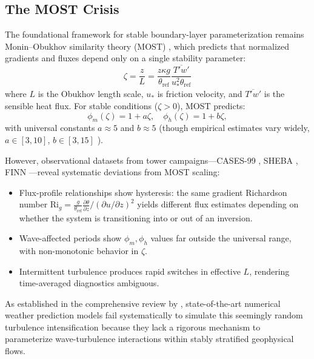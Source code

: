 \documentclass[11pt,a4paper]{article}
\begin{document}
\subsection{The MOST Crisis}

The foundational framework for stable boundary-layer parameterization remains Monin--Obukhov similarity theory (MOST) \citep{Obukhov1946, Paulson1970}, which predicts that normalized gradients and fluxes depend only on a single stability parameter:
\begin{equation}
\zeta = \frac{z}{L} = \frac{z \kappa g}{\theta_{\mathrm{ref}}} \frac{\overline{T'w'}}{u_*^2 \theta_{\mathrm{ref}}}
\label{eq:zeta}
\end{equation}
where $L$ is the Obukhov length scale, $u_*$ is friction velocity, and $\overline{T'w'}$ is the sensible heat flux. For stable conditions ($\zeta > 0$), MOST predicts:
\begin{equation}
\phi_m(\zeta) = 1 + a\zeta, \quad \phi_h(\zeta) = 1 + b\zeta,
\end{equation}
with universal constants $a \approx 5$ and $b \approx 5$ (though empirical estimates vary widely, $a \in [3, 10]$, $b \in [3, 15]$ \citep{Dyer1974, Högström1988}).

However, observational datasets from tower campaigns---CASES-99 \citep{Poulos2002}, SHEBA \citep{Uttal2002}, FINN \citep{Mahrt2013}---reveal systematic deviations from MOST scaling:
\begin{itemize}
  \item Flux-profile relationships show hysteresis: the same gradient Richardson number $\mathrm{Ri}_g = \frac{g}{\theta_{\mathrm{ref}}} \frac{\partial \theta}{\partial z} / (\partial u / \partial z)^2$ yields different flux estimates depending on whether the system is transitioning into or out of an inversion.
  \item Wave-affected periods show $\phi_m, \phi_h$ values far outside the universal range, with non-monotonic behavior in $\zeta$.
  \item Intermittent turbulence produces rapid switches in effective $L$, rendering time-averaged diagnostics ambiguous.
\end{itemize}

As established in the comprehensive review by \citet{Sun2015}, state-of-the-art numerical weather prediction models fail systematically to simulate this seemingly random turbulence intensification because they lack a rigorous mechanism to parameterize wave-turbulence interactions within stably stratified geophysical flows.
\end{document}
